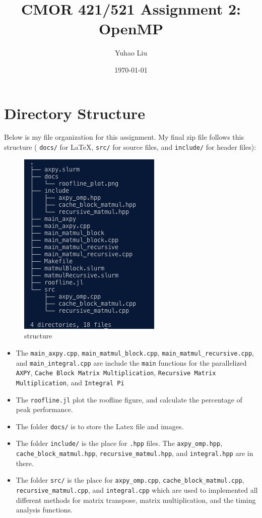\documentclass[11pt]{article}
\title{CMOR 421/521 Assignment 2: OpenMP}
\author{Yuhao Liu}
\date{\today}
\begin{document}
\maketitle

\tableofcontents
\bigskip

\newpage

\section{Directory Structure}
Below is my file organization for this assignment. 
My final zip file follows this structure ( \texttt{docs/} for LaTeX, \texttt{src/} for source files, and \texttt{include/} for header files):

\begin{figure}[H]
    \centering
    \includegraphics[width=0.3\linewidth]{Assignments/HW2/docs/images/structure.png}
    \caption{structure}
    \label{fig:structure}
\end{figure}

\begin{itemize}
    \item The \verb|main_axpy.cpp|, \verb|main_matmul_block.cpp|, \verb|main_matmul_recursive.cpp|, and \verb|main_integral.cpp| are include the \verb|main| functions for the parallelized \verb|AXPY|, \verb|Cache Block Matrix Multiplication|, \verb|Recursive Matrix Multiplication|, and \verb|Integral Pi|
    \item The \verb|roofline.jl| plot the roofline figure, and calculate the percentage of peak performance.
    \item The folder \texttt{docs/} is to store the Latex file and images.
    \item The folder \texttt{include/} is the place for \verb|.hpp| files. The \verb|axpy_omp.hpp|, \verb|cache_block_matmul.hpp|, \verb|recursive_matmul.hpp|, and \verb|integral.hpp| are in there.
    \item The folder \texttt{src/} is the place for \verb|axpy_omp.cpp|, \verb|cache_block_matmul.cpp|, \verb|recursive_matmul.cpp|, and \verb|integral.cpp|  which are used to implemented all different methods for matrix transpose, matrix multiplication, and the timing analysis functions.

\end{itemize}
\end{document}
